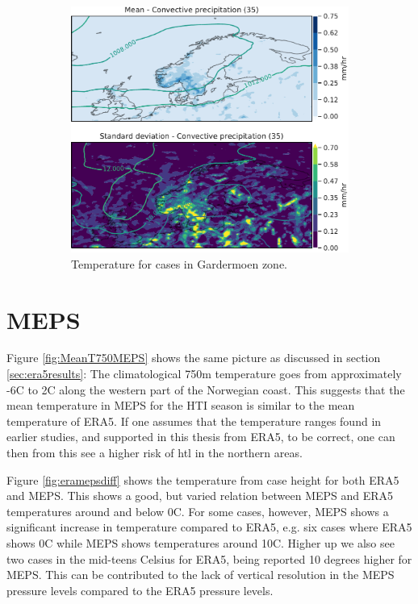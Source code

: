 \begin{figure}
    \begin{subfigure}[b]{0.5\textwidth}
    \centering
    \includegraphics[width=\textwidth]{Figures/cPENGM.pdf}
    \caption{Temperature for cases in Gardermoen zone.}
    \label{fig:ENGMcP}
\end{subfigure}
\caption{ }
\label{fig:convectiveairports}
\end{figure}


\section{MEPS}
Figure \ref{fig:MeanT750MEPS} shows the same picture as discussed in section \ref{sec:era5results}: The climatological 750m temperature goes from approximately -6C to 2C along the western part of the Norwegian coast. This suggests that the mean temperature in MEPS for the HTI season is similar to the mean temperature of ERA5. If one assumes that the temperature ranges found in earlier studies, and supported in this thesis from ERA5, to be correct, one can then from this see a higher risk of \acrshort{htl} in the northern areas.

Figure \ref{fig:eramepsdiff} shows the temperature from case height for both ERA5 and MEPS. This shows a good, but varied relation between MEPS and ERA5 temperatures around and below 0C. For some cases, however, MEPS shows a significant increase in temperature compared to ERA5, e.g. six cases where ERA5 shows 0C while MEPS shows temperatures around 10C. Higher up we also see two cases in the mid-teens Celsius for ERA5, being reported 10 degrees higher for MEPS. This can be contributed to the lack of vertical resolution in the MEPS pressure levels compared to the ERA5 pressure levels. 

